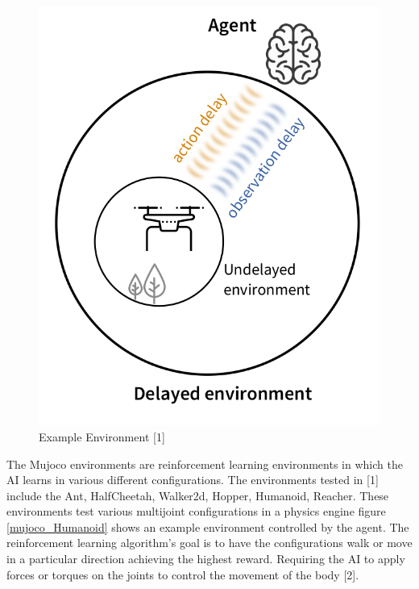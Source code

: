 \documentclass{article} %
\begin{document}
\begin{figure}[H]
\begin{center}
\includegraphics[scale=0.2]{images/fig1FromPaper}
\end{center}
\caption{Example Environment [1]}
\label{environmentImage}
\end{figure}

The Mujoco environments are reinforcement learning environments in which the AI learns in
various different configurations. 
The environments tested in [1] include the Ant, HalfCheetah, Walker2d, Hopper, Humanoid,
Reacher. 
These environments test various multijoint configurations in a physics engine figure \ref{mujoco_Humanoid} 
shows an example environment controlled by the agent.
The reinforcement learning algorithm's goal is to have the configurations walk or move in a 
particular direction achieving the highest reward. 
Requiring the AI to apply forces or torques on the joints to control the movement of the body 
[2].
\end{document}
